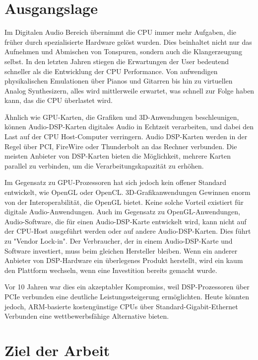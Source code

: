 \section{Ausgangslage}

Im Digitalen Audio Bereich übernimmt die CPU immer mehr Aufgaben, die früher durch spezialisierte Hardware gelöst wurden. Dies beinhaltet nicht nur das Aufnehmen und Abmischen von Tonspuren, sondern auch die Klangerzeugung selbst. In den letzten Jahren stiegen die Erwartungen der User bedeutend schneller als die Entwicklung der CPU Performance. Von aufwendigen physikalischen Emulationen über Pianos und Gitarren bis hin zu virtuellen Analog Synthesizern, alles wird mittlerweile erwartet, was schnell zur Folge haben kann, das die CPU überlastet wird.

Ähnlich wie GPU-Karten, die Grafiken und 3D-Anwendungen beschleunigen, können Audio-DSP-Karten digitales Audio in Echtzeit verarbeiten, und dabei den Last auf der CPU Host-Computer verringern. Audio DSP-Karten werden in der Regel  über PCI, FireWire oder Thunderbolt an das Rechner verbunden. Die meisten Anbieter von DSP-Karten bieten die Möglichkeit, mehrere Karten parallel zu verbinden, um die Verarbeitungskapazität zu erhöhen.

Im Gegensatz zu GPU-Prozessoren hat sich jedoch kein offener Standard entwickelt, wie OpenGL oder OpenCL. 3D-Grafikanwendungen Gewinnen enorm von der Interoperabilität, die OpenGL bietet. Keine solche Vorteil existiert für digitale Audio-Anwendungen. Auch im Gegensatz zu OpenGL-Anwendungen, Audio-Software, die für einen Audio-DSP-Karte entwickelt wird, kann nicht auf der CPU-Host ausgeführt werden oder auf andere Audio-DSP-Karten. Dies führt zu "Vendor Lock-in". Der Verbraucher, der in einem Audio-DSP-Karte und Software investiert, muss beim gleichen Hersteller bleiben. Wenn ein anderer Anbieter von DSP-Hardware ein überlegenes Produkt herstellt, wird ein kaum den Plattform wechseln, wenn eine Investition bereits gemacht wurde.

Vor 10 Jahren war dies ein akzeptabler Kompromiss, weil DSP-Prozessoren über PCIe verbunden eine deutliche Leistungssteigerung ermöglichten. Heute könnten jedoch, ARM-basierte kostengünstige CPUs über Standard-Gigabit-Ethernet Verbunden eine wettbewerbsfähige Alternative bieten.

\section{Ziel der Arbeit}

